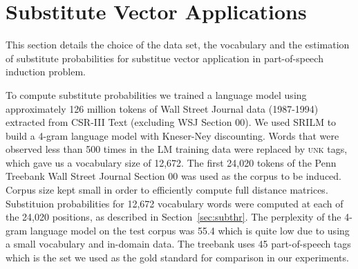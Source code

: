 \section{Substitute Vector Applications}
\label{sec:subapp}
This section details the choice of the data set, the vocabulary and
the estimation of substitute probabilities for substitue vector
application in part-of-speech induction problem.

To compute substitute probabilities we trained a language model using
approximately 126 million tokens of Wall Street Journal data
(1987-1994) extracted from CSR-III Text \cite{csr3text} (excluding WSJ
Section 00).
We used SRILM \cite{Stolcke2002} to build a 4-gram language model with
Kneser-Ney discounting.
Words that were observed less than 500 times in the LM training data
were replaced by \textsc{unk} tags, which gave us a vocabulary size of
12,672.
The first 24,020 tokens of the Penn Treebank \cite{treebank3} Wall
Street Journal Section 00 was used as the corpus to be induced.
Corpus size kept small in order to efficiently compute full distance
matrices.  Substituion probabilities for 12,672 vocabulary words were
computed at each of the 24,020 positions, as described in
Section~\ref{sec:subthr}.
The perplexity of the 4-gram language model on the test corpus was
55.4 which is quite low due to using a small
vocabulary and in-domain data.
The treebank uses 45 part-of-speech tags which is the set we used as
the gold standard for comparison in our experiments.  
